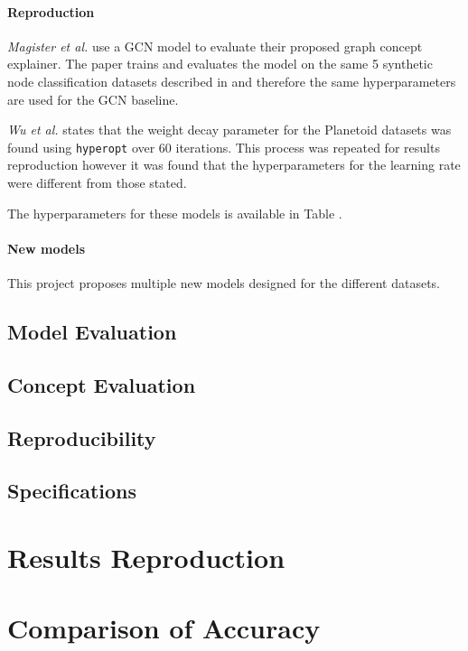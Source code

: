 \paragraph{Reproduction}
\textit{Magister et al.}\cite{magister2021gcexplainer} use a GCN model to evaluate their proposed graph concept explainer.
The paper trains and evaluates the model on the same 5 synthetic node classification datasets described in  and therefore the same hyperparameters are used for the GCN baseline.

\textit{Wu et al.}\cite{wu2019simplifying} states that the weight decay parameter for the Planetoid datasets was found using \texttt{hyperopt} over 60 iterations.
This process was repeated for results reproduction however it was found that the hyperparameters for the learning rate were different from those stated.

The hyperparameters for these models is available in Table .

\paragraph{New models}
This project proposes multiple new models designed for the different datasets.

\subsection{Model Evaluation}

\subsection{Concept Evaluation}

\subsection{Reproducibility}

\subsection{Specifications}

\section{Results Reproduction}

\section{Comparison of Accuracy}

